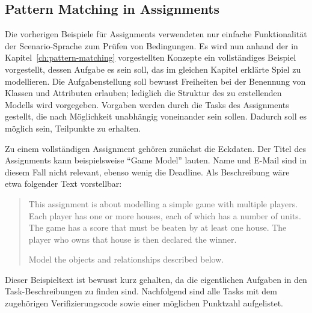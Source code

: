 \subsection{Pattern Matching in Assignments}\label{subsec:assignment-pattern-matching}

Die vorherigen Beispiele für Assignments verwendeten nur einfache Funktionalität der Scenario-Sprache zum Prüfen von Bedingungen.
Es wird nun anhand der in Kapitel~\ref{ch:pattern-matching} vorgestellten Konzepte ein vollständiges Beispiel vorgestellt, dessen Aufgabe es sein soll, das im gleichen Kapitel erklärte Spiel zu modellieren.
Die Aufgabenstellung soll bewusst Freiheiten bei der Benennung von Klassen und Attributen erlauben;
lediglich die Struktur des zu erstellenden Modells wird vorgegeben.
Vorgaben werden durch die Tasks des Assignments gestellt, die nach Möglichkeit unabhängig voneinander sein sollen.
Dadurch soll es möglich sein, Teilpunkte zu erhalten.

Zu einem vollständigen Assignment gehören zunächst die Eckdaten.
Der Titel des Assignments kann beispielsweise ``Game Model'' lauten.
Name und E-Mail sind in diesem Fall nicht relevant, ebenso wenig die Deadline.
Als Beschreibung wäre etwa folgender Text vorstellbar:

\begin{quote}
    This assignment is about modelling a simple game with multiple players.
    Each player has one or more houses, each of which has a number of units.
    The game has a score that must be beaten by at least one house.
    The player who owns that house is then declared the winner.

    Model the objects and relationships described below.
\end{quote}

Dieser Beispieltext ist bewusst kurz gehalten, da die eigentlichen Aufgaben in den Task-Beschreibungen zu finden sind.
Nachfolgend sind alle Tasks mit dem zugehörigen Verifizierungscode sowie einer möglichen Punktzahl aufgelistet.

